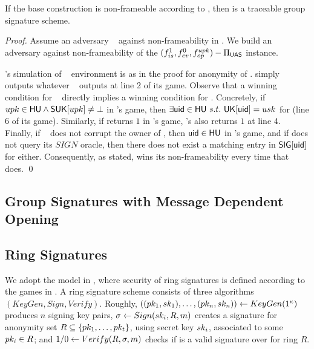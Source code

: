 \begin{theorem}
  If the base \CUASGen construction is non-frameable according to
  , then \CUASGS is a traceable group signature
  scheme.
\end{theorem}

\begin{proof}
  Assume an adversary \adv~ against non-frameability in \CUASGS. We build an
  adversary \advB against non-frameability of the $(f_{is}^1,f_{ev}^0,
  f_{op}^{upk})-\Pi_{\mathsf{UAS}}$ instance.

  \advB's simulation of \adv~ environment is as in the proof for anonymity
  of \CUASGS. \advB simply outputs whatever \adv~ outputs at line 2 of its
  game. Observe that a winning condition for \adv~ directly implies a winning
  condition for \advB. Concretely, if $upk \in \mathsf{HU} \land \mathsf{S}\mathsf{UK}[upk] \neq
  \bot$ in \adv's game, then $\exists \mathsf{uid} \in \mathsf{HU}~s.t.~\mathsf{UK}[\mathsf{uid}]=usk$
  for \advB (line 6 of its game). Similarly, if \Judge returns $1$ in \adv's
  game, \advB's \Judge also returns $1$ at line 4. Finally, if \adv~ does not
  corrupt the owner of \upk, then $\mathsf{uid} \in \mathsf{HU}$ in \advB's game, and if \adv
  does not query its $SIGN$ oracle, then there does not exist a matching entry
  in $\mathsf{SIG}[\mathsf{uid}]$ for \advB either. Consequently, as stated, \advB wins its
  non-frameability every time that \adv does.
  \qed
\end{proof}


\subsection{Group Signatures with Message Dependent Opening}
\label{sapp:related-models-gsmdo}

\subsection{Ring Signatures}
\label{sapp:related-models-rs}

We adopt the model in \cite{bkm06}, where security of ring signatures is
defined according to the games in . A ring signature
scheme consists of three algorithms $(KeyGen,Sign,Verify)$. Roughly,
$((pk_1,sk_1),\dots,(pk_n,sk_n)) \gets KeyGen(1^\kappa)$ produces $n$
signing key pairs, $\sigma \gets Sign(sk_i,R,m)$ creates a signature for
anonymity set $R \subseteq \lbrace pk_1, \dots, pk_t \rbrace$, using secret
key $sk_i$, associated to some $pk_i \in R$; and $1/0 \gets Verify(R,\sigma,
m)$ checks if \sig is a valid signature over \msg for ring $R$.

